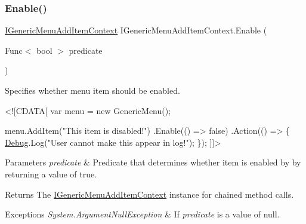 \subsubsection{\texorpdfstring{Enable()}{Enable()}\hspace{0.1cm}{\footnotesize\ttfamily [2/2]}}
{\footnotesize\ttfamily \hyperlink{interface_i_generic_menu_add_item_context}{I\+Generic\+Menu\+Add\+Item\+Context} I\+Generic\+Menu\+Add\+Item\+Context.\+Enable (\begin{DoxyParamCaption}\item[{Func$<$ bool $>$}]{predicate }\end{DoxyParamCaption})}



Specifies whether menu item should be enabled. 


\begin{DoxyCode}
<![CDATA[
var menu = \textcolor{keyword}{new} GenericMenu();

menu.AddItem(\textcolor{stringliteral}{"This item is disabled!"})
    .Enable(() => \textcolor{keyword}{false})
    .Action(() => \{
        \hyperlink{namespace_debug}{Debug}.Log(\textcolor{stringliteral}{"User cannot make this appear in log!"});
    \});
]]>
\end{DoxyCode}
 


\begin{DoxyParams}{Parameters}
{\em predicate} & Predicate that determines whether item is enabled by by returning a value of {\ttfamily true}.\\
\hline
\end{DoxyParams}
\begin{DoxyReturn}{Returns}
The \hyperlink{interface_i_generic_menu_add_item_context}{I\+Generic\+Menu\+Add\+Item\+Context} instance for chained method calls. 
\end{DoxyReturn}

\begin{DoxyExceptions}{Exceptions}
{\em System.\+Argument\+Null\+Exception} & If {\itshape predicate}  is a value of {\ttfamily null}. \\
\hline
\end{DoxyExceptions}
\mbox{\label{interface_i_generic_menu_add_item_context_aa9cbeb32f7807860a29493d9a3b9d0ab}} 
